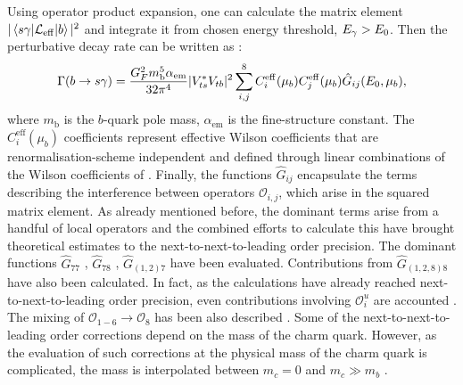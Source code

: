Using operator product expansion, one can calculate the matrix element $|\mel*{s\gamma}{\mathcal{L}_{\mathrm{eff}}}{b}|^2$ and integrate it from chosen energy threshold, ${E_{\gamma}}>E_0$. 
Then the perturbative decay rate can be written as \cite{Misiak:2020vlo}:
\begin{equation}\label{eq:theory_decay_rate}
    \Gamma(b\rightarrow s\gamma) = \frac{G^2_F m_{\mathrm{b}}^5 \alpha_{\mathrm{em}}}{32\pi^4}|V_{ts}^*V_{tb}|^2\sum_{i,j}^8C^{\mathrm{eff}}_{i}(\mu_b)C^{\mathrm{eff}}_{j}(\mu_b)\hat{G}_{ij}(E_0,\mu_b),
\end{equation}
where $m_{\mathrm{b}}$ is the $b$-quark pole mass, $\alpha_{\mathrm{em}}$ is the fine-structure constant.
The $C_{i}^{\mathrm{eff}}(\mu_b)$ coefficients represent effective Wilson coefficients \cite{Buras:1993xp} that are renormalisation-scheme independent and defined through linear combinations of the Wilson coefficients of .
Finally, the functions $\hat{G}_{ij}$ encapsulate the terms describing the interference between operators $\mathcal{O}_{i,j}$, which arise in the squared matrix element.
As already mentioned before, the dominant terms arise from a handful of local operators and the combined efforts to calculate this have brought \BtoXsgamma theoretical estimates to the next-to-next-to-leading order precision.
The dominant functions $\hat{G}_{77}$ \cite{Asatrian:2006rq}, $\hat{G}_{78}$ \cite{Asatrian:2010rq}, $\hat{G}_{(1,2)7}$ \cite{Boughezal:2007ny,Misiak:2020vlo} have been evaluated.
Contributions from $\hat{G}_{(1,2,8)8}$ \cite{Ferroglia:2010xe,Misiak:2010tk} have also been calculated.
In fact, as the calculations have already reached next-to-next-to-leading order precision, even contributions involving $\mathcal{O}_{i}^u$ are accounted \cite{Huber:2014nna}.
The mixing of $\mathcal{O}_{1-6}\to\mathcal{O}_8$ has been also described \cite{Czakon:2006ss}. 
Some of the next-to-next-to-leading order corrections depend on the mass of the charm quark.
However, as the evaluation of such corrections at the physical mass of the charm quark is complicated, the mass is interpolated between $m_c=0$ and $m_c\gg m_b$ \cite{Misiak:2019ccp}.

